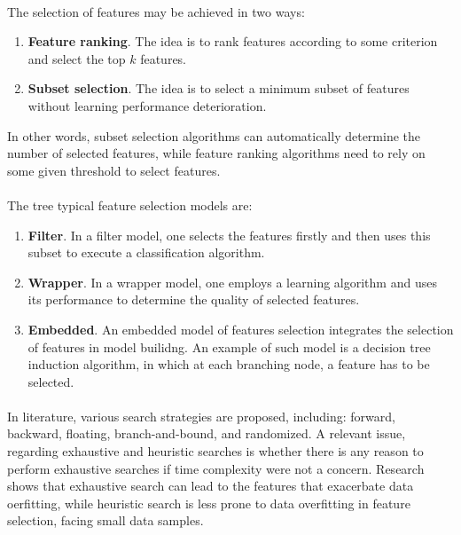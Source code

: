 \documentclass[10pt]{article}\usepackage[]{graphicx}\usepackage[]{color}
\begin{document}
\paragraph{}
The selection of features may be achieved in two ways:
\begin{enumerate}
\item \textbf{Feature ranking}. The idea is to rank features according to some criterion and select the top $k$ features.
\item \textbf{Subset selection}. The idea is to select a minimum subset of features without learning performance deterioration.  
\end{enumerate}
In other words, subset selection algorithms can automatically determine the number of selected features, while feature ranking algorithms need to rely on some given threshold to select features. 

\paragraph{}
The tree typical feature selection models are:
\begin{enumerate}
\item \textbf{Filter}. In a filter model, one selects the features firstly and then uses this subset to execute a classification algorithm. 
\item \textbf{Wrapper}. In a wrapper model, one employs a learning algorithm and uses its performance to determine the quality of selected features. 
\item \textbf{Embedded}. An embedded model of features selection integrates the selection of features in model builidng. An example of such model is a decision tree induction algorithm, in which at each branching node, a feature has to be selected. 
\end{enumerate}

\paragraph{}
In literature, various search strategies are proposed, including: forward, backward, floating, branch-and-bound, and randomized. A relevant issue, regarding exhaustive and heuristic searches is whether there is any reason to perform exhaustive searches if time complexity were not a concern. Research shows that exhaustive search can lead to the features that exacerbate data oerfitting, while heuristic search is less prone to data overfitting in feature selection, facing small data samples.
\end{document}
